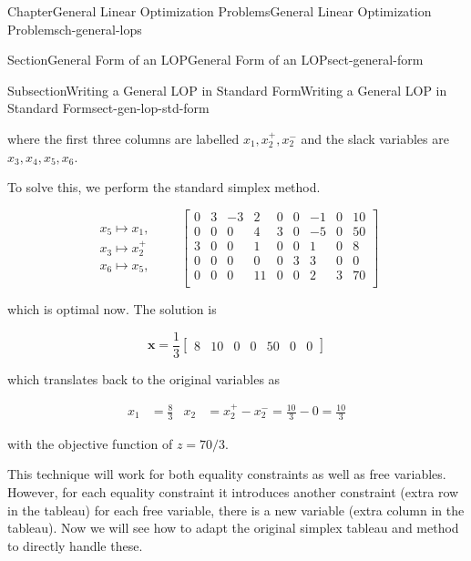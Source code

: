 \documentclass[oneside,10pt,]{book}
\numberwithin{equation}{section}
\newcommand{\amp}{&}
\begin{document}
\begin{chapterptx}{Chapter}{General Linear Optimization Problems}{}{General Linear Optimization Problems}{}{}{ch-general-lops}
\begin{sectionptx}{Section}{General Form of an LOP}{}{General Form of an LOP}{}{}{sect-general-form}
\begin{subsectionptx}{Subsection}{Writing a General LOP in Standard Form}{}{Writing a General LOP in Standard Form}{}{}{sect-gen-lop-std-form}
%
\par
where the first three columns are labelled \(x_1, x_2^+, x_2^-\) and the slack variables are \(x_3,x_4,x_5,x_6\).%
\par
To solve this, we perform the standard simplex method.%
\par
%
\begin{equation*}
\begin{array}{r} x_5 \mapsto x_1, \\ x_3 \mapsto x_2^+ \\ x_6 \mapsto x_5, \end{array} \qquad \left[\begin{array}{rrr|rrrrr|r} 0 \amp 3 \amp -3 \amp 2 \amp 0 \amp 0 \amp -1 \amp 0 \amp 10\\ 0 \amp 0 \amp 0 \amp 4 \amp 3 \amp 0 \amp -5 \amp 0 \amp 50\\ 3 \amp 0 \amp 0 \amp 1 \amp 0 \amp 0 \amp 1 \amp 0 \amp 8\\ 0 \amp 0 \amp 0 \amp 0 \amp 0 \amp 3 \amp 3 \amp 0 \amp 0\\ \hline 0 \amp 0 \amp 0 \amp 11 \amp 0 \amp 0 \amp 2 \amp 3 \amp 70\\ \end{array} \right]
\end{equation*}
%
\par
which is optimal now. The solution is%
\par
%
\begin{equation*}
\boldsymbol{x} = \frac{1}{3} \left[\begin{array}{rrr|rrrr} 8 \amp 10 \amp 0 \amp 0 \amp 50 \amp 0 \amp 0 \end{array}\right]
\end{equation*}
%
\par
which translates back to the original variables as%
\par
%
\begin{equation*}
\begin{aligned} x_1 \amp = \frac{8}{3} \amp x_2 \amp =  x_2^{+} - x_2^- = \frac{10}{3} - 0 = \frac{10}{3}\end{aligned}
\end{equation*}
%
\par
with the objective function of \(z= 70/3\).%
\par
This technique will work for both equality constraints as well as free variables. However, for each equality constraint it introduces another constraint (extra row in the tableau) for each free variable, there is a new variable (extra column in the tableau). Now we will see how to adapt the original simplex tableau and method to directly handle these.%

\end{subsectionptx}
\end{sectionptx}
\end{chapterptx}
\end{document}
